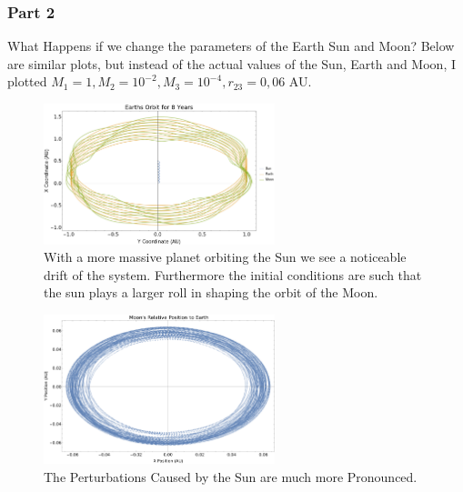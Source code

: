 \documentclass{article}
\begin{document}
\subsubsection{Part 2}

What Happens if we change the parameters of the Earth Sun and Moon?
Below are similar plots, but instead of the actual values of the Sun, Earth and Moon, I plotted $M_1 = 1, M_2 = 10^{-2}, M_3 = 10^{-4}, r_{23} = 0,06$ AU. 

\begin{figure}[!htb]
	\begin{center}
		\includegraphics[width=0.6\textwidth]{images/p1-2a.pdf}
	\end{center}
	\caption{With a more massive planet orbiting the Sun we see a noticeable drift of the system. Furthermore the initial conditions are such that the sun plays a larger roll in shaping the orbit of the Moon.}
\label{fig:qual}
\end{figure}
\FloatBarrier

\begin{figure}[!htb]
	\begin{center}
		\includegraphics[width=0.6\textwidth]{images/p1-2b.pdf}
	\end{center}
	\caption{The Perturbations Caused by the Sun are much more Pronounced.}
\label{fig:qual}
\end{figure}
\FloatBarrier
\end{document}

